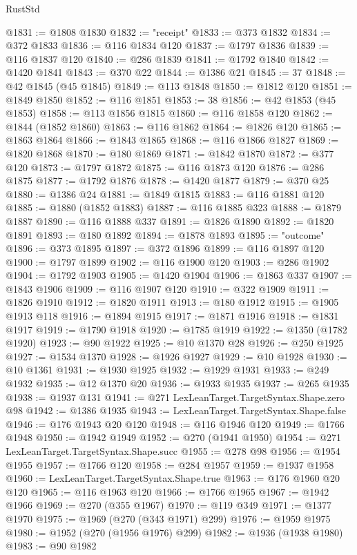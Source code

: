 \begin{lexlean}{RustStd}
\begin{coremodule}
@1831 := @1808 @1830
@1832 := "receipt"
@1833 := @373 @1832
@1834 := @372 @1833
@1836 := @116 @1834 @120
@1837 := @1797 @1836
@1839 := @116 @1837 @120
@1840 := @286 @1839
@1841 := @1792 @1840
@1842 := @1420 @1841
@1843 := @370 @22
@1844 := @1386 @21
@1845 := 37
@1848 := @42 @1845 (@45 @1845)
@1849 := @113 @1848
@1850 := @1812 @120
@1851 := @1849 @1850
@1852 := @116 @1851
@1853 := 38
@1856 := @42 @1853 (@45 @1853)
@1858 := @113 @1856 @1815
@1860 := @116 @1858 @120
@1862 := @1844 (@1852 @1860)
@1863 := @116 @1862
@1864 := @1826 @120
@1865 := @1863 @1864
@1866 := @1843 @1865
@1868 := @116 @1866 @1827
@1869 := @1820 @1868
@1870 := @180 @1869
@1871 := @1842 @1870
@1872 := @377 @120
@1873 := @1797 @1872
@1875 := @116 @1873 @120
@1876 := @286 @1875
@1877 := @1792 @1876
@1878 := @1420 @1877
@1879 := @370 @25
@1880 := @1386 @24
@1881 := @1849 @1815
@1883 := @116 @1881 @120
@1885 := @1880 (@1852 @1883)
@1887 := @116 @1885 @323
@1888 := @1879 @1887
@1890 := @116 @1888 @337
@1891 := @1826 @1890
@1892 := @1820 @1891
@1893 := @180 @1892
@1894 := @1878 @1893
@1895 := "outcome"
@1896 := @373 @1895
@1897 := @372 @1896
@1899 := @116 @1897 @120
@1900 := @1797 @1899
@1902 := @116 @1900 @120
@1903 := @286 @1902
@1904 := @1792 @1903
@1905 := @1420 @1904
@1906 := @1863 @337
@1907 := @1843 @1906
@1909 := @116 @1907 @120
@1910 := @322 @1909
@1911 := @1826 @1910
@1912 := @1820 @1911
@1913 := @180 @1912
@1915 := @1905 @1913 @118
@1916 := @1894 @1915
@1917 := @1871 @1916
@1918 := @1831 @1917
@1919 := @1790 @1918
@1920 := @1785 @1919
@1922 := @1350 (@1782 @1920)
@1923 := @90 @1922
@1925 := @10 @1370 @28
@1926 := @250 @1925
@1927 := @1534 @1370
@1928 := @1926 @1927
@1929 := @10 @1928
@1930 := @10 @1361
@1931 := @1930 @1925
@1932 := @1929 @1931
@1933 := @249 @1932
@1935 := @12 @1370 @20
@1936 := @1933 @1935
@1937 := @265 @1935
@1938 := @1937 @131
@1941 := @271 LexLeanTarget.TargetSyntax.Shape.zero @98
@1942 := @1386 @1935
@1943 := LexLeanTarget.TargetSyntax.Shape.false
@1946 := @176 @1943 @20 @120
@1948 := @116 @1946 @120
@1949 := @1766 @1948
@1950 := @1942 @1949
@1952 := @270 (@1941 @1950)
@1954 := @271 LexLeanTarget.TargetSyntax.Shape.succ
@1955 := @278 @98
@1956 := @1954 @1955
@1957 := @1766 @120
@1958 := @284 @1957
@1959 := @1937 @1958
@1960 := LexLeanTarget.TargetSyntax.Shape.true
@1963 := @176 @1960 @20 @120
@1965 := @116 @1963 @120
@1966 := @1766 @1965
@1967 := @1942 @1966
@1969 := @270 (@355 @1967)
@1970 := @119 @349
@1971 := @1377 @1970
@1975 := @1969 (@270 (@343 @1971) @299)
@1976 := @1959 @1975
@1980 := @1952 (@270 (@1956 @1976) @299)
@1982 := @1936 (@1938 @1980)
@1983 := @90 @1982

\end{coremodule}
\end{lexlean}
